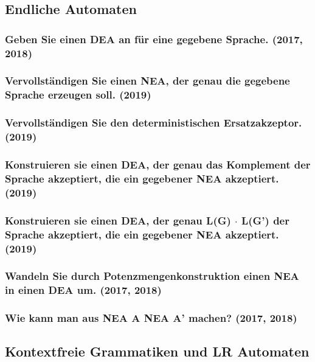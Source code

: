 


\subsection{Endliche Automaten}

\subsubsection{Geben Sie einen DEA an für eine gegebene Sprache. (2017, 2018)}

\subsubsection{Vervollständigen Sie einen NEA, der genau die gegebene Sprache erzeugen soll. (2019)}

\subsubsection{Vervollständigen Sie den deterministischen Ersatzakzeptor. (2019)}

\subsubsection{Konstruieren sie einen DEA, der genau das Komplement der Sprache akzeptiert, die ein gegebener NEA akzeptiert. (2019)}

\subsubsection{Konstruieren sie einen DEA, der genau L(G) $\cdot$ L(G') der Sprache akzeptiert, die ein gegebener NEA akzeptiert. (2019)}

\subsubsection{Wandeln Sie durch Potenzmengenkonstruktion einen NEA in einen DEA um. (2017, 2018)}

\subsubsection{Wie kann man aus NEA A NEA A' machen? (2017, 2018)}

\subsection{Kontextfreie Grammatiken und LR Automaten}

